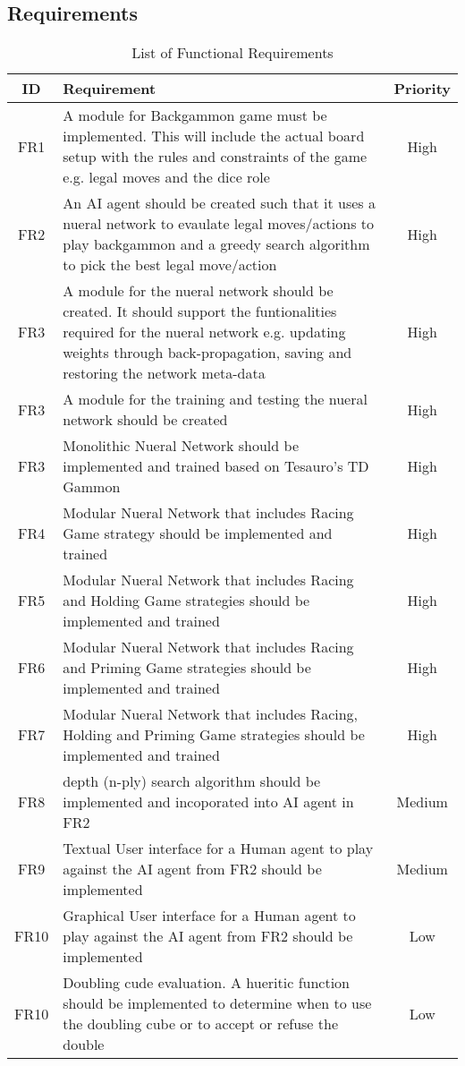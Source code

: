 \documentclass[12pt,a4paper]{article}
\begin{document}
\subsection{Requirements}
\begin{table}[htb]
    \centering
    \caption{List of Functional Requirements}
    \vspace*{6pt}
    \label{req}
    \begin{tabular}{cp{12cm}c}
        \hline
        \hline
        ID & Requirement & Priority \\ 
        \hline
        FR1 & A module for Backgammon game must be implemented. This will include the actual board setup with the rules and constraints of the game e.g. legal moves and the dice role & High \\
        \hline
        FR2 & An AI agent should be created such that it uses a nueral network to evaulate legal moves/actions to play backgammon and a greedy search algorithm to pick the best legal move/action & High \\
        \hline
        FR3 & A module for the nueral network should be created. It should support the funtionalities required for the nueral network e.g. updating weights through back-propagation, saving and restoring the network meta-data & High \\
        \hline
        FR3 & A module for the training and testing the nueral network should be created & High \\
        \hline
        FR3 & Monolithic Nueral Network should be implemented and trained based on Tesauro's TD Gammon & High \\
        \hline
        FR4 & Modular Nueral Network that includes Racing Game strategy should be implemented and trained & High \\
        \hline
        FR5 & Modular Nueral Network that includes Racing and Holding Game strategies should be implemented and trained & High \\
        \hline
        FR6 & Modular Nueral Network that includes Racing and Priming Game strategies should be implemented and trained & High \\
        \hline
        FR7 & Modular Nueral Network that includes Racing, Holding and Priming Game strategies should be implemented and trained & High \\
        \hline
        FR8 & depth (n-ply) search algorithm should be implemented and incoporated into AI agent in FR2 & Medium \\
        \hline
        FR9 & Textual User interface for a Human agent to play against the AI agent from FR2 should be implemented & Medium \\
        \hline
        FR10 & Graphical User interface for a Human agent to play against the AI agent from FR2 should be implemented & Low \\
        \hline
        FR10 & Doubling cude evaluation. A hueritic function should be implemented to determine when to use the doubling cube or to accept or refuse the double & Low \\
        \hline
        
    \end{tabular}
\end{table}
\end{document}
